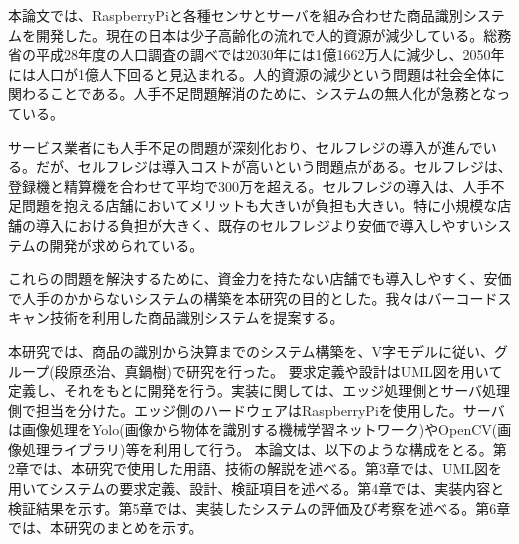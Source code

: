 本論文では、RaspberryPiと各種センサとサーバを組み合わせた商品識別システムを開発した。現在の日本は少子高齢化の流れで人的資源が減少している。総務省の平成28年度の人口調査の調べでは2030年には1億1662万人に減少し、2050年には人口が1億人下回ると見込まれる\cite{population}。人的資源の減少という問題は社会全体に関わることである。人手不足問題解消のために、システムの無人化が急務となっている。

サービス業者にも人手不足の問題が深刻化おり、セルフレジの導入が進んでいる。だが、セルフレジは導入コストが高いという問題点がある。セルフレジは、登録機と精算機を合わせて平均で300万を超える\cite{self_register}。セルフレジの導入は、人手不足問題を抱える店舗においてメリットも大きいが負担も大きい。特に小規模な店舗の導入における負担が大きく、既存のセルフレジより安価で導入しやすいシステムの開発が求められている。

これらの問題を解決するために、資金力を持たない店舗でも導入しやすく、安価で人手のかからないシステムの構築を本研究の目的とした。我々はバーコードスキャン技術を利用した商品識別システムを提案する。

本研究では、商品の識別から決算までのシステム構築を、V字モデルに従い、グループ(段原丞治、真鍋樹)で研究を行った。
要求定義や設計はUML図を用いて定義し、それをもとに開発を行う。実装に関しては、エッジ処理側とサーバ処理側で担当を分けた。エッジ側のハードウェアはRaspberryPiを使用した。サーバは画像処理をYolo(画像から物体を識別する機械学習ネットワーク)\cite{yolo}やOpenCV(画像処理ライブラリ)\cite{opencv}等を利用して行う。
本論文は、以下のような構成をとる。第2章では、本研究で使用した用語、技術の解説を述べる。第3章では、UML図を用いてシステムの要求定義、設計、検証項目を述べる。第4章では、実装内容と検証結果を示す。第5章では、実装したシステムの評価及び考察を述べる。第6章では、本研究のまとめを示す。